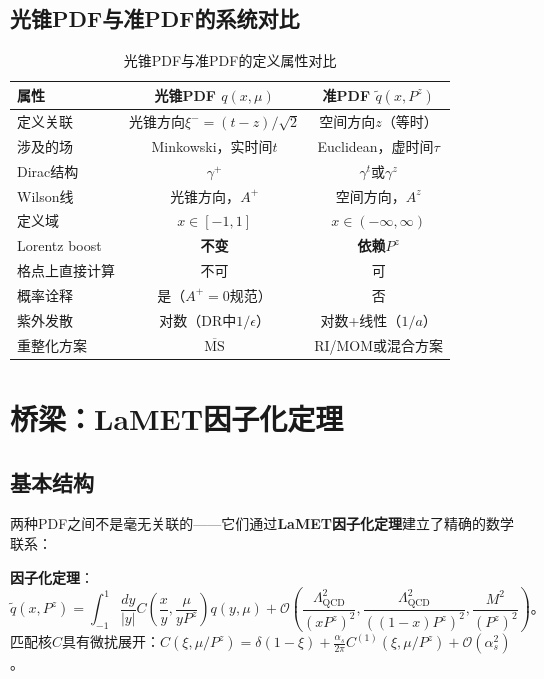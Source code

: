 \documentclass[12pt,a4paper]{ctexart}
\theoremstyle{definition}
\begin{document}
\subsection{光锥PDF与准PDF的系统对比}

\begin{table}[H]
\centering
\caption{光锥PDF与准PDF的定义属性对比}
\label{tab:LC_vs_quasi}
\begin{tabular}{lcc}
\toprule
属性 & 光锥PDF $q(x,\mu)$ & 准PDF $\tilde{q}(x,P^z)$ \\
\midrule
定义关联 & 光锥方向$\xi^- = (t-z)/\sqrt{2}$ & 空间方向$z$（等时） \\
涉及的场 & Minkowski，实时间$t$ & Euclidean，虚时间$\tau$ \\
Dirac结构 & $\gamma^+$ & $\gamma^t$或$\gamma^z$ \\
Wilson线 & 光锥方向，$A^+$ & 空间方向，$A^z$ \\
定义域 & $x \in [-1,1]$ & $x \in (-\infty,\infty)$ \\
Lorentz boost & \textbf{不变} & \textbf{依赖}$P^z$ \\
格点上直接计算 & 不可 & 可 \\
概率诠释 & 是（$A^+=0$规范） & 否 \\
紫外发散 & 对数（DR中$1/\epsilon$） & 对数+线性（$1/a$） \\
重整化方案 & $\overline{\text{MS}}$ & RI/MOM或混合方案 \\
\bottomrule
\end{tabular}
\end{table}

\section{桥梁：LaMET因子化定理}

\subsection{基本结构}

两种PDF之间不是毫无关联的——它们通过\textbf{LaMET因子化定理}建立了精确的数学联系\cite{Izubuchi2018}：

\textbf{因子化定理}\cite{Izubuchi2018}：
\begin{equation}
\boxed{\tilde{q}(x, P^z) = \int_{-1}^{1} \frac{dy}{|y|} C\left(\frac{x}{y}, \frac{\mu}{yP^z}\right) q(y, \mu) + \mathcal{O}\left(\frac{\Lambda_{\text{QCD}}^2}{(xP^z)^2}, \frac{\Lambda_{\text{QCD}}^2}{((1-x)P^z)^2}, \frac{M^2}{(P^z)^2}\right)}。
\label{eq:factorization_theorem}
\end{equation}
匹配核$C$具有微扰展开：$C(\xi, \mu/P^z) = \delta(1-\xi) + \frac{\alpha_s}{2\pi}C^{(1)}(\xi, \mu/P^z) + \mathcal{O}(\alpha_s^2)$。
\end{document}
